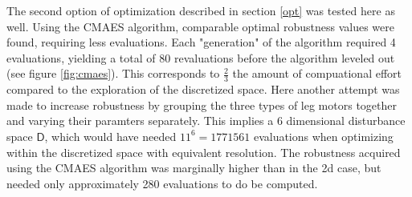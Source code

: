     The second option of optimization described in section \ref{opt} was tested here as well. Using the CMAES algorithm, comparable optimal robustness values were found, requiring less evaluations. Each "generation" of the algorithm required 4 evaluations, yielding a total of 80 revaluations before the algorithm leveled out (see figure \ref{fig:cmaes}). This corresponds to $\frac{2}{3}$ the amount of compuational effort compared to the exploration of the discretized space. 
    Here another attempt was made to increase robustness by grouping the three types of leg motors together and varying their paramters separately. This implies a 6 dimensional disturbance space $\mathsf{D}$, which would have needed $11^6=1771561$ evaluations when optimizing within the discretized space with equivalent resolution. The robustness acquired using the CMAES algorithm was marginally higher than in the 2d case, but needed only approximately 280 evaluations to do be computed.  


































